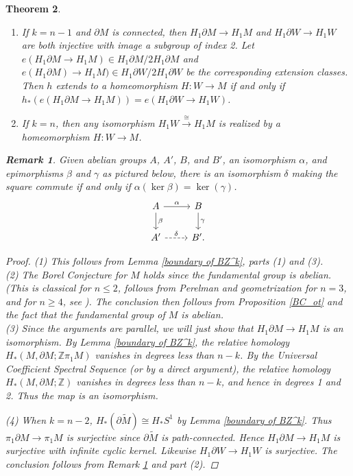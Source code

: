 \documentclass[12pt]{amsart}
\newtheorem{theorem}{Theorem}
\theoremstyle{definition}
\newtheorem{remark}[theorem]{Remark}
\newcommand{\Z}{\mathbb Z}
\newcommand{\wt}[1]{{\widetilde{#1}}}
\begin{document}
\begin{theorem}
\begin{enumerate}
is the identity.
\item If $k = n-1$ and $\partial M$ is connected, then $H_1\partial M \to  H_1M$ and $H_1\partial W \to H_1W$ are both injective with image a subgroup of index 2.   Let $e(H_1\partial M \to  H_1M) \in H_1\partial M /2 H_1\partial M $ and  $e(H_1\partial M) \to  H_1M) \in H_1\partial W /2 H_1\partial W $ be the corresponding extension classes.  Then $h$ extends to a homeomorphism  $H : W \to M$ if and only if $h_*(e(H_1\partial M \to  H_1M)) = e(H_1\partial W \to  H_1W)$.
\item If $k = n$, then any isomorphism $H_1W \xrightarrow{\cong} H_1M$ is realized by a homeomorphism $H : W \to M$.
\end{enumerate}

\begin{remark}\label{surjective remark}
Given abelian groups $A$, $A'$, $B$, and $B'$, an isomorphism $\alpha$, and epimorphisms $\beta$ and $\gamma$ as pictured below, there is an isomorphism $\delta$ making the square commute if and only if $\alpha(\ker \beta) = \ker(\gamma)$.
$$
\begin{tikzcd}
A \arrow[r,"\alpha"]  \arrow[d,"\beta"] &  B  \arrow[d,"\gamma"] \\
A' \arrow[r,dashed,"\delta"] &  B'.
\end{tikzcd}
$$
\end{remark}

\begin{proof}
\noindent (1)   This follows from Lemma \ref{boundary of BZ^k}, parts (1) and (3).\\
\noindent (2)   The Borel Conjecture for $M$ holds since the fundamental group is abelian. (This is classical for $n \leq 2$, follows from Perelman and geometrization for $n=3$, and for $n \geq 4$, see \cite{BFL}).
The conclusion then follows from Proposition  \ref{BC_ot} and the fact that the fundamental group of $M$ is abelian.\\
\noindent (3)      Since the arguments are parallel, we will just show that $H_1 \partial M \to H_1M$ is an isomorphism.   By Lemma \ref{boundary of BZ^k}, the relative homology  \\$H_*(M,\partial M ;\Z \pi_1M)$ vanishes in degrees less than $n-k$.   By the Universal Coefficient Spectral Sequence (or by a direct argument),   the relative homology  $H_*(M,\partial M ;\Z)$ vanishes in degrees less than $n-k$, and hence in degrees 1 and 2.   Thus the  map is an isomorphism. 

\noindent (4)   When $k = n-2$, $H_*(\partial \wt M)\cong H_*S^1$ by Lemma \ref{boundary of BZ^k}.    Thus  $\pi_1\partial M \to \pi_1M$ is surjective since $\partial \wt M$ is path-connected.   Hence  $H_1\partial M \to H_1M$ is surjective with infinite cyclic kernel.  Likewise $H_1\partial W \to H_1W$ is surjective.   The conclusion follows from Remark \ref{surjective remark} and part (2).


\end{proof}
\end{theorem}
\end{document}
